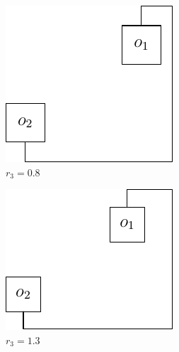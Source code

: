 \documentclass[a4paper,12pt]{report}
\begin{document}
\begin{figure}
  \centering
  \begin{subfigure}{.33\textwidth}
    \centering
    \includegraphics[width=0.9\linewidth]{connectorExample_r3_0_8.pdf}
    \caption{$r_3=0.8$}
  \end{subfigure}\hfill
  \begin{subfigure}{.33\textwidth}
    \centering
    \includegraphics[width=0.9\linewidth]{connectorExample_r3_1_3.pdf}
    \caption{$r_3=1.3$}
  \end{subfigure}\hfill
  \begin{subfigure}{.33\textwidth}

\end{subfigure}
\end{figure}
\end{document}

